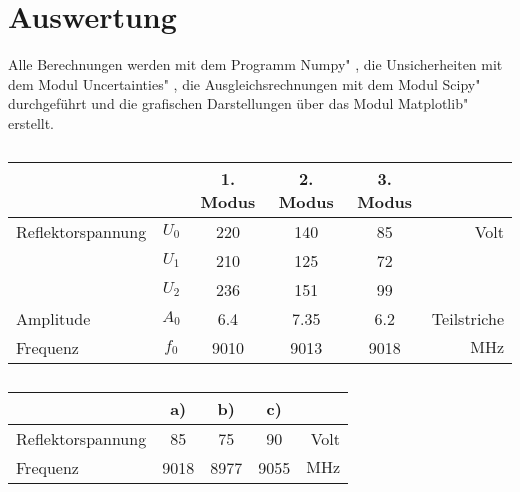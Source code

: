 \section{Auswertung}
\label{sec:Auswertung}
Alle Berechnungen werden mit dem Programm \glqq Numpy" \cite{numpy}, die Unsicherheiten mit dem Modul \glqq Uncertainties" \cite{uncertainties}, die Ausgleichsrechnungen mit dem Modul \glqq Scipy" \cite{scipy} durchgeführt und die grafischen Darstellungen über das Modul \glqq Matplotlib" \cite{matplotlib} erstellt.











\begin{table}
    \centering
    \caption{}
    \label{tab:}
    \renewcommand{\arraystretch}{2} 
    \begin{tabular}{|l c| c| c| c| r|}
        \hline
         & & 1. Modus & 2. Modus & 3. Modus & \\
        \hline
        Reflektorspannung & $U_0$ & 220 & 140 & 85 & Volt \\
         & $U_1$ & 210 & 125 & 72 & \\
         & $U_2$ &  236 & 151 & 99 & \\
        Amplitude & $A_0$ & 6.4 & 7.35 & 6.2 & Teilstriche \\
        Frequenz & $f_0$ & 9010 & 9013 & 9018 & $\si{\mega\hertz}$\\

        \hline

    \end{tabular}
    \renewcommand{\arraystretch}{1} 
\end{table}

\begin{table}
    \centering
    \caption{}
    \label{tab:}
    \renewcommand{\arraystretch}{2} 
    \begin{tabular}{|l |  c| c| c| r|}
        \hline
         &  a) & b) & c) & \\
        \hline
        Reflektorspannung &  85 & 75 & 90 & Volt \\

        Frequenz & 9018 & 8977 & 9055 & $\si{\mega\hertz}$\\

        \hline

    \end{tabular}
    \renewcommand{\arraystretch}{1} 
\end{table}

